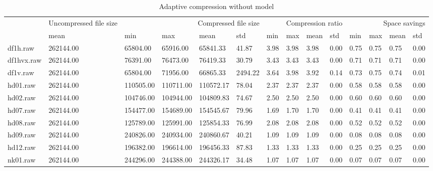 \begin{table}
\caption{Adaptive compression without model}
\begin{tabular}{llllllllllllll}
 & Uncompressed file size & \multicolumn{4}{r}{Compressed file size} & \multicolumn{4}{r}{Compression ratio} & \multicolumn{4}{r}{Space savings} \\
 & mean & min & max & mean & std & min & max & mean & std & min & max & mean & std \\
df1h.raw & 262144.00 & 65804.00 & 65916.00 & 65841.33 & 41.87 & 3.98 & 3.98 & 3.98 & 0.00 & 0.75 & 0.75 & 0.75 & 0.00 \\
df1hvx.raw & 262144.00 & 76391.00 & 76473.00 & 76419.33 & 30.79 & 3.43 & 3.43 & 3.43 & 0.00 & 0.71 & 0.71 & 0.71 & 0.00 \\
df1v.raw & 262144.00 & 65804.00 & 71956.00 & 66865.33 & 2494.22 & 3.64 & 3.98 & 3.92 & 0.14 & 0.73 & 0.75 & 0.74 & 0.01 \\
hd01.raw & 262144.00 & 110505.00 & 110711.00 & 110572.17 & 78.04 & 2.37 & 2.37 & 2.37 & 0.00 & 0.58 & 0.58 & 0.58 & 0.00 \\
hd02.raw & 262144.00 & 104746.00 & 104944.00 & 104809.83 & 74.67 & 2.50 & 2.50 & 2.50 & 0.00 & 0.60 & 0.60 & 0.60 & 0.00 \\
hd07.raw & 262144.00 & 154477.00 & 154689.00 & 154545.67 & 79.96 & 1.69 & 1.70 & 1.70 & 0.00 & 0.41 & 0.41 & 0.41 & 0.00 \\
hd08.raw & 262144.00 & 125789.00 & 125991.00 & 125854.33 & 76.99 & 2.08 & 2.08 & 2.08 & 0.00 & 0.52 & 0.52 & 0.52 & 0.00 \\
hd09.raw & 262144.00 & 240826.00 & 240934.00 & 240860.67 & 40.21 & 1.09 & 1.09 & 1.09 & 0.00 & 0.08 & 0.08 & 0.08 & 0.00 \\
hd12.raw & 262144.00 & 196382.00 & 196614.00 & 196456.33 & 87.83 & 1.33 & 1.33 & 1.33 & 0.00 & 0.25 & 0.25 & 0.25 & 0.00 \\
nk01.raw & 262144.00 & 244296.00 & 244388.00 & 244326.17 & 34.48 & 1.07 & 1.07 & 1.07 & 0.00 & 0.07 & 0.07 & 0.07 & 0.00 \\
\end{tabular}
\end{table}

